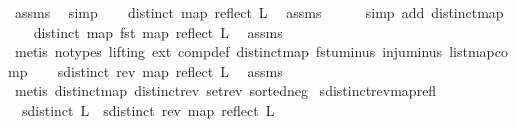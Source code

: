 \begin{isabellebody}
\ assms\ \isamarkupfalse%
\ simp\isanewline
\ \ \isamarkupfalse%
\ {}{\isacharcolon}{\kern0pt}{\isachardoublequoteopen}distinct\ {\isacharparenleft}{\kern0pt}map\ reflect\ L{\isacharparenright}{\kern0pt}{\isachardoublequoteclose}\ \isamarkupfalse%
\ assms\isanewline
\ \ \ \ \isamarkupfalse%
\ {\isacharparenleft}{\kern0pt}simp\ add{\isacharcolon}{\kern0pt}\ distinct{\isacharunderscore}{\kern0pt}map{\isacharparenright}{\kern0pt}\isanewline
\ \ \isamarkupfalse%
\ {\isachardoublequoteopen}distinct\ {\isacharparenleft}{\kern0pt}map\ fst\ {\isacharparenleft}{\kern0pt}map\ reflect\ L{\isacharparenright}{\kern0pt}{\isacharparenright}{\kern0pt}{\isachardoublequoteclose}\ \isamarkupfalse%
\ assms\ {}\ {}\isanewline
\ \ \ \ \isamarkupfalse%
\ {\isacharparenleft}{\kern0pt}metis\ {\isacharparenleft}{\kern0pt}no{\isacharunderscore}{\kern0pt}types{\isacharcomma}{\kern0pt}\ lifting{\isacharparenright}{\kern0pt}\ ext\ comp{\isacharunderscore}{\kern0pt}def\ distinct{\isacharunderscore}{\kern0pt}map\ fst{\isacharunderscore}{\kern0pt}uminus\ inj{\isacharunderscore}{\kern0pt}uminus\ list{\isachardot}{\kern0pt}map{\isacharunderscore}{\kern0pt}comp{\isacharparenright}{\kern0pt}\isanewline
\ \ \isamarkupfalse%
\ {\isachardoublequoteopen}sdistinct\ {\isacharparenleft}{\kern0pt}rev\ {\isacharparenleft}{\kern0pt}map\ reflect\ L{\isacharparenright}{\kern0pt}{\isacharparenright}{\kern0pt}{\isachardoublequoteclose}\ \isamarkupfalse%
\ assms\isanewline
\ \ \ \ \isamarkupfalse%
\ {\isacharparenleft}{\kern0pt}metis\ distinct{\isacharunderscore}{\kern0pt}map\ distinct{\isacharunderscore}{\kern0pt}rev\ set{\isacharunderscore}{\kern0pt}rev\ sorted{\isacharunderscore}{\kern0pt}neg{\isacharparenright}{\kern0pt}\isanewline
{}\isamarkupfalse%
%
\endisatagproof
{\isafoldproof}%
%
\isadelimproof
\isanewline
%
\endisadelimproof
\isanewline
{}\isamarkupfalse%
\ sdistinct{\isacharunderscore}{\kern0pt}rev{\isacharunderscore}{\kern0pt}map{\isacharunderscore}{\kern0pt}refl{\isacharcolon}{\kern0pt}\isanewline
\ \ {\isachardoublequoteopen}sdistinct\ L\ {\isasymlongleftrightarrow}\ sdistinct\ {\isacharparenleft}{\kern0pt}rev\ {\isacharparenleft}{\kern0pt}map\ reflect\ L{\isacharparenright}{\kern0pt}{\isacharparenright}{\kern0pt}{\isachardoublequoteclose}\isanewline
%
\isadelimproof
\ \ %
\endisadelimproof
%
\isatagproof
{}\isamarkupfalse%

\end{isabellebody}
